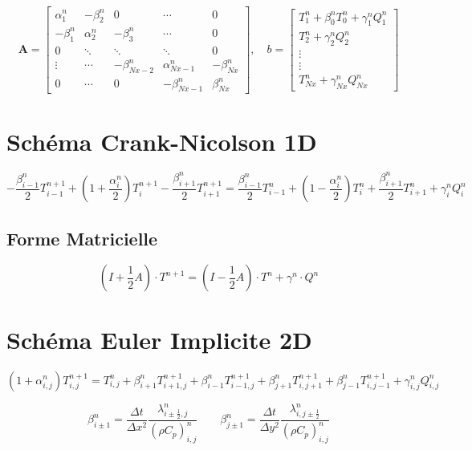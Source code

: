 \documentclass[a4paper,11pt]{article}
\begin{document}
\[
\mathbf{A} =
\begin{bmatrix}
\alpha_1^n & -\beta_2^n & 0 & \cdots & 0 \\
-\beta_1^n & \alpha_2^n & -\beta_3^n & \cdots & 0 \\
0 & \ddots & \ddots & \ddots & 0 \\
\vdots & \cdots & -\beta_{Nx-2}^n & \alpha_{Nx-1}^n & -\beta_{Nx}^n \\
0 & \cdots & 0 & -\beta_{Nx-1}^n & \beta_{Nx}^n
\end{bmatrix}
,\quad
b =
\begin{bmatrix}
    T_1^n + \beta_{0}^n T_0^n + \gamma_1^nQ_1^n \\
    T_2^n + \gamma_2^nQ_2^n  \\
    \vdots \\
    \vdots \\
    T_{Nx}^n + \gamma_{Nx}^nQ_{Nx}^n 
    
\end{bmatrix}
\]

\section*{Schéma Crank-Nicolson 1D}

\[
- \frac{\beta_{i-1}^{n}}{2} T_{i-1}^{n+1} + \left(1 + \frac{\alpha_i^n}{2} \right) T_i^{n+1} - \frac{\beta_{i+1}^n}{2} T_{i+1}^{n+1} =
\frac{\beta_{i-1}^n}{2} T_{i-1}^{n} + \left(1 - \frac{\alpha_i^n}{2} \right) T_i^{n} + \frac{\beta_{i+1}^n}{2} T_{i+1}^{n} + \gamma_i^n Q_i^n
\]

\subsection*{Forme Matricielle}

\[
(I + \frac{1}{2}A) \cdot T^{n+1} = (I - \frac{1}{2}A) \cdot T^n + \gamma^n \cdot Q^n 
\]
\vspace{0.5cm}

\section*{Schéma Euler Implicite 2D}

\[
(1 + \alpha_{i,j}^n) T_{i,j}^{n+1} = T_{i,j}^{n} + \beta_{i+1}^{n} T_{i+1,j}^{n+1} + \beta_{i-1}^{n} T_{i-1,j}^{n+1} + \beta_{j+1}^{n} T_{i,j+1}^{n+1} + \beta_{j-1}^{n} T_{i,j-1}^{n+1} + \gamma_{i,j}^n Q_{i,j}^n
\]

\[
\beta_{i\pm1}^n = \frac{\Delta t}{\Delta x^2} \frac{\lambda_{i \pm \frac{1}{2}, j}^n}{(\rho C_p)_{i,j}^n}
\qquad
\beta_{j\pm1}^n = \frac{\Delta t}{\Delta y^2} \frac{\lambda_{i, j \pm \frac{1}{2}}^n}{(\rho C_p)_{i,j}^n}
\]
\end{document}
